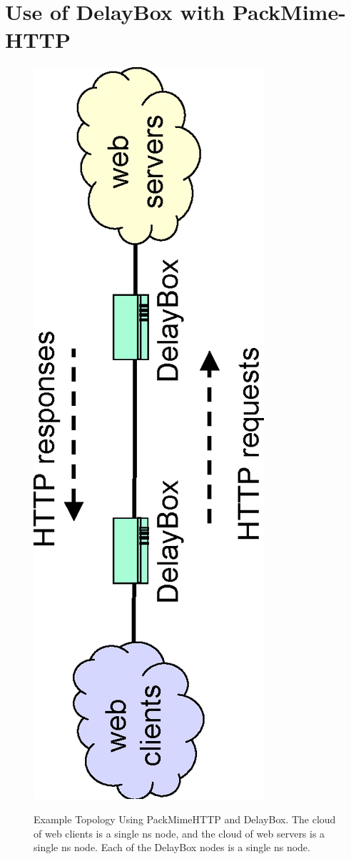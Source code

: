 \section{Use of DelayBox with PackMime-HTTP}
\label{sec:pm-db}

\begin{figure}
\centering
\includegraphics[scale=0.75,angle=270, clip]{figures/packmime-delaybox.eps}
\label{fig-pmdb}
\caption{Example Topology Using PackMimeHTTP and DelayBox. The cloud
  of web clients is a single ns node, and the cloud of web servers is
  a single ns node. Each of the DelayBox nodes is a single ns node.} 
\end{figure}  

